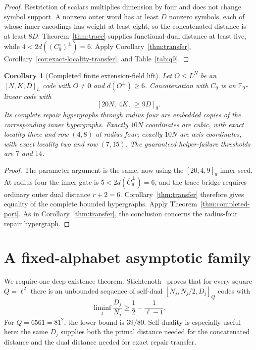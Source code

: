 \documentclass[11pt]{article}
\newtheorem{corollary}[theorem]{Corollary}
\theoremstyle{definition}
\theoremstyle{remark}
\newcommand{\F}{\mathbb{F}}
\begin{document}
\begin{proof}
Restriction of scalars multiplies dimension by four and does not change
symbol support.  A nonzero outer word has at least $D$ nonzero symbols, each
of whose inner encodings has weight at least eight, so the concatenated
distance is at least $8D$.  Theorem~\ref{thm:trace} supplies functional-dual distance at
least five, while $4<2d((C_9^\circ)^\perp)=6$.  Apply
Corollary~\ref{thm:transfer}, Corollary~\ref{cor:exact-locality-transfer},
and Table~\ref{tab:q9}.
\end{proof}

\begin{corollary}[Completed finite extension-field lift]
\label{cor:completed-finite-lift}
Let $O\leq L^N$ be an $[N,K,D]_L$ code with $O\ne0$ and
$d(O^\perp)\geq6$.  Concatenation with $\overline C_9$ is an $\F_9$-linear
code with
\[
 [20N,\ 4K,\ \geq9D]_9.
\]
Its complete repair hypergraphs through radius four are embedded copies of
the corresponding inner hypergraphs.  Exactly $10N$ coordinates are cubic,
with exact locality three and row $(4,8)$ at radius four; exactly $10N$ are
axis coordinates, with exact locality two and row $(7,15)$.  The guaranteed
helper-failure thresholds are $7$ and $14$.
\end{corollary}

\begin{proof}
The parameter argument is the same, now using the $[20,4,9]_9$ inner seed.
At radius four the inner gate is $5<2d(\overline C_9^\perp)=6$, and the trace
bridge requires ordinary outer dual distance $r+2=6$.  Corollary~\ref{thm:transfer}
therefore gives equality of the complete bounded hypergraphs.  Apply
Theorem~\ref{thm:completed-port}.  As in Corollary~\ref{thm:transfer}, the
conclusion concerns the radius-four repair hypergraph.
\end{proof}

\section{A fixed-alphabet asymptotic family}
\label{sec:asymptotic}

We require one deep existence theorem.
Stichtenoth~\cite[Theorem~1.6(ii)]{Stichtenoth2005} proves that for every
square $Q=\ell^2$ there is an unbounded sequence of self-dual
$[N_j,N_j/2,D_j]_Q$ codes with
\[
 \liminf_j\frac{D_j}{N_j}\geq
 \frac12-\frac1{\ell-1}.
\]
For $Q=6561=81^2$, the lower bound is $39/80$.  Self-duality is especially
useful here: the same $D_j$ supplies both the primal distance needed for the
concatenated distance and the dual distance needed for exact repair
transfer.
\end{document}

